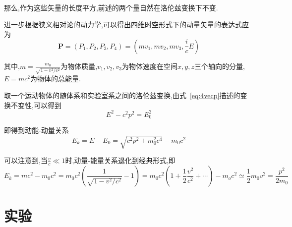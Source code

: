 \documentclass[a4paper]{article}
\begin{document}
那么,作为这些矢量的长度平方,前述的两个量自然在洛伦兹变换下不变.

进一步根据狭义相对论的动力学,可以得出四维时空形式下的动量矢量的表达式应为
\begin{equation}
  \label{eq:4vecp}
  \bm{P} = (P_1, P_2, P_3, P_4) =  (mv_1,mv_2,mv_3, \frac{i}{c}E)
\end{equation}

其中,$m = \frac{m_0}{\sqrt{1-v^2/c^2}}$为物体质量,$v_1,v_2,v_3$为物体速度在空间$x,y,z$三个轴向的分量,$E=mc^2$为物体的总能量.


取一个运动物体的随体系和实验室系之间的洛伦兹变换,由式~\ref{eq:4vecp}描述的变换不变性,可以得到
\begin{equation}
  \label{eq:E-P}
  E^2 - c^2p^2 = E_0^2
\end{equation}

即得到动能-动量关系
\begin{equation}
  \label{eq:Ek-P}
  E_k = E - E_0 = \sqrt{c^2p^2 + m_0^2c^4} - m_0c^2
\end{equation}

可以注意到,当$\frac{v}{c} \ll 1$时,动量-能量关系退化到经典形式,即
\begin{equation}
  \label{eq:classical}
  E_k = mc^2 - m_0c^2 = m_0c^2(\frac{1}{\sqrt{1-v^2/c^2}} - 1) =
  m_0c^2(1 + \frac{1}{2}\frac{v^2}{c^2} + \cdots) - m_oc^2 \simeq
  \frac{1}{2}m_0v^2 = \frac{p^2}{2m_0}
\end{equation}
\newpage
\section{实验} \label{experiment}%
\end{document}
